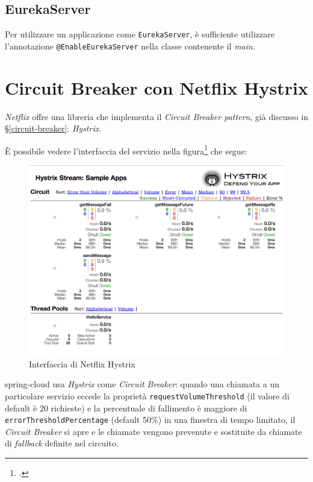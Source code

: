 \subsection{EurekaServer} Per utilizzare un applicazione come \texttt{EurekaServer}, è sufficiente utilizzare l'annotazione \texttt{@EnableEurekaServer} nella classe contenente il \textit{main}.


\section{Circuit Breaker con Netflix Hystrix}

\textit{Netflix} offre una libreria che implementa il \textit{Circuit Breaker pattern}, già discusso in \S\ref{circuit-breaker}: \textit{Hystrix}.

È possibile vedere l'interfaccia del servizio nella figura\footcite{site:fonte-netflix-hystrix} che segue:

\begin{figure}[H]
	\centering
	\includegraphics[width=\textwidth]{immagini/Hystrix.png}
	\caption[Interfaccia di Netflix Hystrix]{Interfaccia di Netflix Hystrix}
	\label{netflix-hystrix}
\end{figure}

\gls{spring-cloud} usa \textit{Hystrix} come \textit{Circuit Breaker}:
quando una chiamata a un particolare servizio eccede la proprietà \texttt{requestVolumeThreshold} (il valore di default è 20 richieste) e la percentuale di fallimento è maggiore di \texttt{errorThresholdPercentage} (default 50\%) in una finestra di tempo limitato,
il \textit{Circuit Breaker} si apre e le chiamate vengono prevenute e sostituite da chiamate di \textit{fallback} definite nel circuito.

